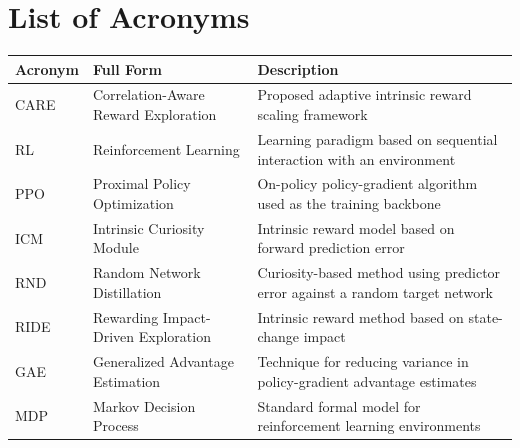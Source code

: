 \chapter*{List of Acronyms}
{}

\begin{tabular}{|m{2.2cm}|m{5.5cm}|m{6cm}|}
    \hline
    \textbf{Acronym} & \textbf{Full Form} & \textbf{Description} \\
    \hline
    CARE & Correlation-Aware Reward Exploration & Proposed adaptive intrinsic reward scaling framework \\
    \hline
    RL & Reinforcement Learning & Learning paradigm based on sequential interaction with an environment \\
    \hline
    PPO & Proximal Policy Optimization & On-policy policy-gradient algorithm used as the training backbone \\
    \hline
    ICM & Intrinsic Curiosity Module & Intrinsic reward model based on forward prediction error \\
    \hline
    RND & Random Network Distillation & Curiosity-based method using predictor error against a random target network \\
    \hline
    RIDE & Rewarding Impact-Driven Exploration & Intrinsic reward method based on state-change impact \\
    \hline
    GAE & Generalized Advantage Estimation & Technique for reducing variance in policy-gradient advantage estimates \\
    \hline
    MDP & Markov Decision Process & Standard formal model for reinforcement learning environments \\
    \hline
\end{tabular}

